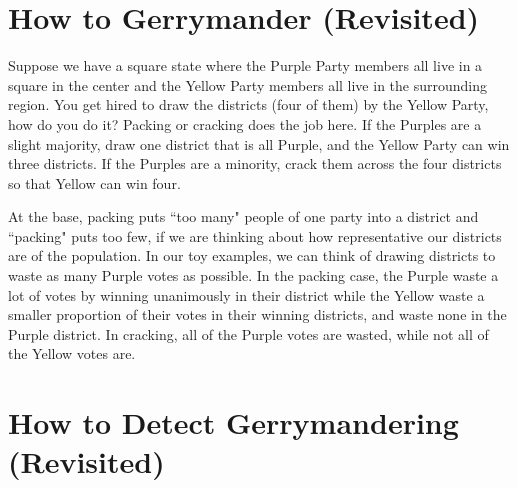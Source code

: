 





\section*{How to Gerrymander (Revisited)}

Suppose we have a square state where the Purple Party members all live in a square in the center and the Yellow Party members all live in the surrounding region.  You get hired to draw the districts (four of them) by the Yellow Party, how do you do it?  Packing or cracking does the job here.  If the Purples are a slight majority, draw one district that is all Purple, and the Yellow Party can win three districts.  If the Purples are a minority, crack them across the four districts so that Yellow can win four.


At the base, packing puts ``too many" people of one party into a district and ``packing" puts too few, if we are thinking about how representative our districts are of the population.  In our toy examples, we can think of drawing districts to waste as many Purple votes as possible.  In the packing case, the Purple waste a lot of votes by winning unanimously in their district while the Yellow waste a smaller proportion of their votes in their winning districts, and waste none in the Purple district.  In cracking, all of the Purple votes are wasted, while not all of the Yellow votes are.


\section*{How to Detect Gerrymandering (Revisited)}



